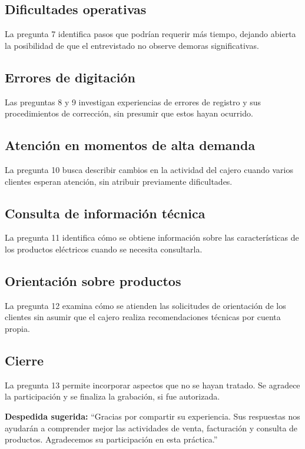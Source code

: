 \subsection{Dificultades operativas}
La pregunta 7 identifica pasos que podrían requerir más tiempo, dejando abierta la posibilidad de que el entrevistado no observe demoras significativas.

\subsection{Errores de digitación}
Las preguntas 8 y 9 investigan experiencias de errores de registro y sus procedimientos de corrección, sin presumir que estos hayan ocurrido.

\subsection{Atención en momentos de alta demanda}
La pregunta 10 busca describir cambios en la actividad del cajero cuando varios clientes esperan atención, sin atribuir previamente dificultades.

\subsection{Consulta de información técnica}
La pregunta 11 identifica cómo se obtiene información sobre las características de los productos eléctricos cuando se necesita consultarla.

\subsection{Orientación sobre productos}
La pregunta 12 examina cómo se atienden las solicitudes de orientación de los clientes sin asumir que el cajero realiza recomendaciones técnicas por cuenta propia.

\subsection{Cierre}
La pregunta 13 permite incorporar aspectos que no se hayan tratado. Se agradece la participación y se finaliza la grabación, si fue autorizada.

\noindent\textbf{Despedida sugerida:} ``Gracias por compartir su experiencia. Sus respuestas nos ayudarán a comprender mejor las actividades de venta, facturación y consulta de productos. Agradecemos su participación en esta práctica.''

